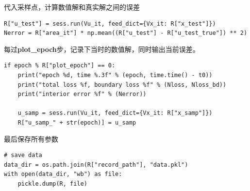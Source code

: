 \documentclass[12pt,a4paper]{article}
\begin{document}
代入采样点，计算数值解和真实解之间的误差
\begin{lstlisting}
R["u_test"] = sess.run(Vu_it, feed_dict={Vx_it: R["x_test"]})
Nerror = R["area_it"] * np.mean((R["u_test"] - R["u_test_true"]) ** 2)
\end{lstlisting}

每过\textbf{plot\_epoch}步，记录下当时的数值解，同时输出当前误差。
\begin{lstlisting}
if epoch % R["plot_epoch"] == 0:
    print("epoch %d, time %.3f" % (epoch, time.time() - t0))
    print("total loss %f, boundary loss %f" % (Nloss, Nloss_bd))
    print("interior error %f" % (Nerror))

    u_samp = sess.run(Vu_it, feed_dict={Vx_it: R["x_samp"]})
    R["u_samp_" + str(epoch)] = u_samp
\end{lstlisting}

最后保存所有参数
\begin{lstlisting}
# save data
data_dir = os.path.join(R["record_path"], "data.pkl")
with open(data_dir, "wb") as file:
    pickle.dump(R, file)
\end{lstlisting}
\end{document}
